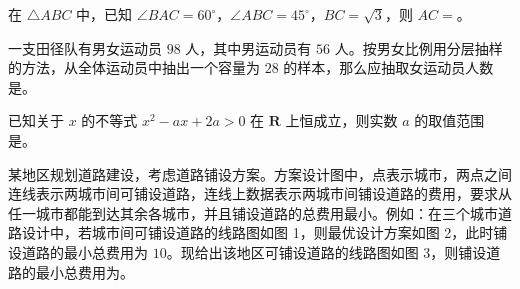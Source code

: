\begin{question}
在 $\triangle ABC$ 中，已知 $\angle BAC=60^\circ$，$\angle ABC=45^\circ$，$BC=\sqrt3$，则 $AC=$\gkblank{}。

\end{question}
\begin{question}
一支田径队有男女运动员 $98$ 人，其中男运动员有 $56$ 人。按男女比例用分层抽样的方法，从全体运动员中抽出一个容量为 $28$ 的样本，那么应抽取女运动员人数是\gkblank{}。

\end{question}
\begin{question}
已知关于 $x$ 的不等式 $x^2-ax+2a>0$ 在 $\mathbf R$ 上恒成立，则实数 $a$ 的取值范围是\gkblank{}。

\Needspace{0.4\textheight}
\end{question}
\begin{question}
某地区规划道路建设，考虑道路铺设方案。方案设计图中，点表示城市，两点之间连线表示两城市间可铺设道路，连线上数据表示两城市间铺设道路的费用，要求从任一城市都能到达其余各城市，并且铺设道路的总费用最小。例如：在三个城市道路设计中，若城市间可铺设道路的线路图如图 1，则最优设计方案如图 2，此时铺设道路的最小总费用为 $10$。现给出该地区可铺设道路的线路图如图 3，则铺设道路的最小总费用为\gkblank{}。
\nopagebreak[4]
\begin{center}\end{center}
\nopagebreak[4]
\nopagebreak[4]
\begin{center}\end{center}
\nopagebreak[4]
\nopagebreak[4]
\begin{center}\end{center}
\nopagebreak[4]
\end{question}

